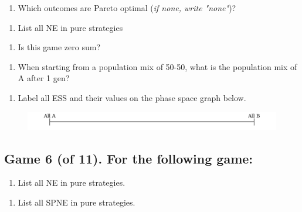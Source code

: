 \documentclass[11pt]{article}
\begin{document}
\begin{enumerate}[label=\alph*), start=1]
\item  Which outcomes are Pareto optimal (\textit{if none, write "none"})? \hfill \raisebox{-1ex}{\rule{4.2cm}{1pt}}

\end{enumerate}
\begin{enumerate}[label=\alph*), start=2]
\item  List all NE in pure strategies \hfill \raisebox{-1ex}{\rule{4.2cm}{1pt}}

\end{enumerate}
\begin{enumerate}[label=\alph*), start=3]
\item  Is this game zero sum? \hfill \raisebox{-1ex}{\rule{4.2cm}{1pt}}

\end{enumerate}
\begin{enumerate}[label=\alph*), start=4]
\item  When starting from a population mix of 50-50, what is the population mix of A after 1 gen?

\end{enumerate}
\hfill \raisebox{-1ex}{\rule{4.2cm}{1pt}}

\vspace{2cm}

\begin{enumerate}[label=\alph*), start=5]
\item  Label all ESS and their values on the phase space graph below.

\end{enumerate}

\begin{figure}[h!]
\centering
\includegraphics[width=\textwidth]{Images/phase_space_graph.png}
\end{figure}

\subsection*{Game 6 (of 11). For the following game:
}

\begin{enumerate}[label=\alph*), start=1]
\item  List all NE in pure strategies. \hfill \raisebox{-1ex}{\rule{4.2cm}{1pt}}

\end{enumerate}
\begin{enumerate}[label=\alph*), start=2]
\item  List all SPNE in pure strategies. \hfill \raisebox{-1ex}{\rule{4.2cm}{1pt}}

\end{enumerate}
\end{document}
